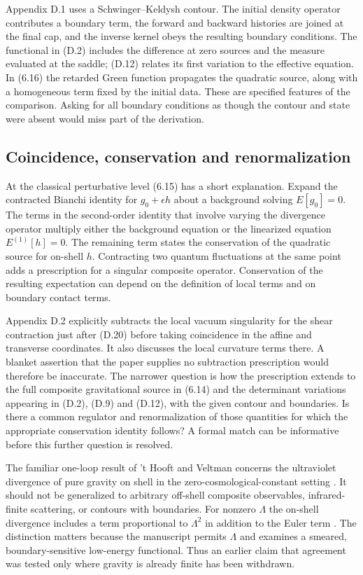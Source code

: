 \documentclass[11pt]{article}
\begin{document}
Appendix D.1 uses a Schwinger--Keldysh contour. The initial density operator contributes a boundary term, the forward and backward histories are joined at the final cap, and the inverse kernel obeys the resulting boundary conditions. The functional in (D.2) includes the difference at zero sources and the measure evaluated at the saddle; (D.12) relates its first variation to the effective equation. In (6.16) the retarded Green function propagates the quadratic source, along with a homogeneous term fixed by the initial data. These are specified features of the comparison. Asking for all boundary conditions as though the contour and state were absent would miss part of the derivation.

\subsection{Coincidence, conservation and renormalization}
At the classical perturbative level (6.15) has a short explanation. Expand the contracted Bianchi identity for $g_0+\epsilon h$ about a background solving $E[g_0]=0$. The terms in the second-order identity that involve varying the divergence operator multiply either the background equation or the linearized equation $E^{(1)}[h]=0$. The remaining term states the conservation of the quadratic source for on-shell $h$. Contracting two quantum fluctuations at the same point adds a prescription for a singular composite operator. Conservation of the resulting expectation can depend on the definition of local terms and on boundary contact terms.

Appendix D.2 explicitly subtracts the local vacuum singularity for the shear contraction just after (D.20) before taking coincidence in the affine and transverse coordinates. It also discusses the local curvature terms there. A blanket assertion that the paper supplies no subtraction prescription would therefore be inaccurate. The narrower question is how the prescription extends to the full composite gravitational source in (6.14) and the determinant variations appearing in (D.2), (D.9) and (D.12), with the given contour and boundaries. Is there a common regulator and renormalization of those quantities for which the appropriate conservation identity follows? A formal match can be informative before this further question is resolved.

The familiar one-loop result of 't Hooft and Veltman concerns the ultraviolet divergence of pure gravity on shell in the zero-cosmological-constant setting \cite{thv}. It should not be generalized to arbitrary off-shell composite observables, infrared-finite scattering, or contours with boundaries. For nonzero $\Lambda$ the on-shell divergence includes a term proportional to $\Lambda^2$ in addition to the Euler term \cite{bps}. The distinction matters because the manuscript permits $\Lambda$ and examines a smeared, boundary-sensitive low-energy functional. Thus an earlier claim that agreement was tested only where gravity is already finite has been withdrawn.
\end{document}
